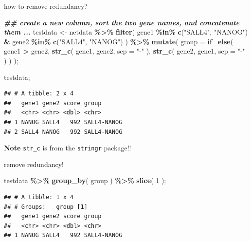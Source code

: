 \documentclass[ignorenonframetext,]{beamer}
\newenvironment{Shaded}{\begin{snugshade}}{\end{snugshade}}
\newcommand{\AttributeTok}[1]{\textcolor[rgb]{0.13,0.29,0.53}{#1}}
\newcommand{\DecValTok}[1]{\textcolor[rgb]{0.00,0.00,0.81}{#1}}
\newcommand{\DocumentationTok}[1]{\textcolor[rgb]{0.56,0.35,0.01}{\textbf{\textit{#1}}}}
\newcommand{\FunctionTok}[1]{\textcolor[rgb]{0.13,0.29,0.53}{\textbf{#1}}}
\newcommand{\NormalTok}[1]{#1}
\newcommand{\OtherTok}[1]{\textcolor[rgb]{0.56,0.35,0.01}{#1}}
\newcommand{\SpecialCharTok}[1]{\textcolor[rgb]{0.81,0.36,0.00}{\textbf{#1}}}
\newcommand{\StringTok}[1]{\textcolor[rgb]{0.31,0.60,0.02}{#1}}
\newcommand\FontSmall{\fontsize{7}{8}\selectfont}
\newcommand\FontNormal{\fontsize{10}{10}\selectfont}
\begin{document}
\begin{frame}[fragile]{how to remove redundancy?}
\protect\hypertarget{how-to-remove-redundancy}{}
\FontSmall

\begin{Shaded}
\begin{Highlighting}[]
\DocumentationTok{\#\# create a new column, sort the two gene names, and concatenate them ... }
\NormalTok{testdata }\OtherTok{\textless{}{-}} 
\NormalTok{  netdata }\SpecialCharTok{\%\textgreater{}\%} \FunctionTok{filter}\NormalTok{( gene1 }\SpecialCharTok{\%in\%} \FunctionTok{c}\NormalTok{(}\StringTok{"SALL4"}\NormalTok{, }\StringTok{"NANOG"}\NormalTok{) }\SpecialCharTok{\&}\NormalTok{ gene2 }\SpecialCharTok{\%in\%} \FunctionTok{c}\NormalTok{(}\StringTok{"SALL4"}\NormalTok{, }\StringTok{"NANOG"}\NormalTok{) ) }\SpecialCharTok{\%\textgreater{}\%} 
  \FunctionTok{mutate}\NormalTok{( }\AttributeTok{group  =}  
            \FunctionTok{if\_else}\NormalTok{( gene1 }\SpecialCharTok{\textgreater{}}\NormalTok{ gene2, }
                     \FunctionTok{str\_c}\NormalTok{( gene1, gene2, }\AttributeTok{sep =} \StringTok{"{-}"}\NormalTok{ ), }
                     \FunctionTok{str\_c}\NormalTok{( gene2, gene1, }\AttributeTok{sep =} \StringTok{"{-}"}\NormalTok{ ) ) );}

\NormalTok{testdata;}
\end{Highlighting}
\end{Shaded}

\begin{verbatim}
## # A tibble: 2 x 4
##   gene1 gene2 score group      
##   <chr> <chr> <dbl> <chr>      
## 1 NANOG SALL4   992 SALL4-NANOG
## 2 SALL4 NANOG   992 SALL4-NANOG
\end{verbatim}

\FontNormal

\textbf{Note} \texttt{str\_c} is from the \texttt{stringr} package!!
\end{frame}

\begin{frame}[fragile]{remove redundancy!}
\protect\hypertarget{remove-redundancy}{}
\FontSmall

\begin{Shaded}
\begin{Highlighting}[]
\NormalTok{testdata }\SpecialCharTok{\%\textgreater{}\%} \FunctionTok{group\_by}\NormalTok{( group ) }\SpecialCharTok{\%\textgreater{}\%} \FunctionTok{slice}\NormalTok{( }\DecValTok{1}\NormalTok{ );}
\end{Highlighting}
\end{Shaded}

\begin{verbatim}
## # A tibble: 1 x 4
## # Groups:   group [1]
##   gene1 gene2 score group      
##   <chr> <chr> <dbl> <chr>      
## 1 NANOG SALL4   992 SALL4-NANOG
\end{verbatim}
\end{frame}
\end{document}
